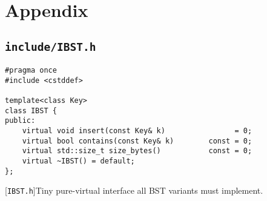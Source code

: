 \newpage
\section{Appendix}
\label{sec:app}

\subsection{\texttt{include/IBST.h}}
\label{secsec:ibst-h}
\begin{lstlisting}
#pragma once
#include <cstddef>

template<class Key>
class IBST {
public:
    virtual void insert(const Key& k)                = 0;
    virtual bool contains(const Key& k)        const = 0;
    virtual std::size_t size_bytes()           const = 0;
    virtual ~IBST() = default;
};
\end{lstlisting}
[\texttt{IBST.h}]{Tiny pure-virtual interface all BST
variants must implement.}
\label{lst:ibst-h}

